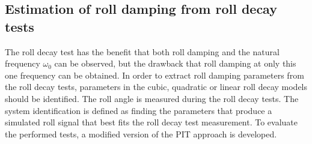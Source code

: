 \subsection{Estimation of roll damping from roll decay tests}
\label{se:experimental_estimation}
The roll decay test has the benefit that both roll damping and the natural frequency $\omega_0$ can be observed, but the drawback that roll damping at only this one frequency can be obtained. In order to extract roll damping parameters from the roll decay tests, parameters in the cubic, quadratic or linear roll decay models should be identified. The roll angle is measured during the roll decay tests. The system identification is defined as finding the parameters that produce a simulated roll signal that best fits the roll decay test measurement. 
To evaluate the performed tests, a modified version of the PIT approach is developed. 



%
%
%
%




